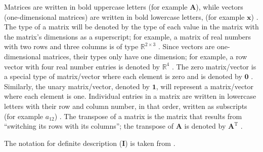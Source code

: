 \documentclass[12pt]{article}
\newcommand*{\defDesc}{\mathbf{I}}
\begin{document}
Matrices are written in bold uppercase letters (for example $\textbf{A}$),
while vectors (one-dimensional matrices) are written in bold lowercase letters,
(for example
$\textbf{x}$) \cite{osullivan_appendix_2010}. The type of a matrix will be
denoted by the type of each value in the matrix with the matrix's dimensions
as a superscript; for example, a matrix of real numbers with two rows and
three columns is of type $\mathbb{R}^{2 \times 3}$
\cite[p.~3]{golub_matrix_2013}. Since vectors are one-dimensional
matrices, their types only have one dimension; for example, a row vector with
four real number entries is denoted by $\mathbb{R}^{4}$
\cite[p.~4]{golub_matrix_2013}. The zero matrix/vector is a special
type of matrix/vector where each element is zero and is denoted by
$\textbf{0}$ \cite{weisstein_zero_2023}. Similarly, the unary matrix/vector,
denoted by $\textbf{1}$, will represent a matrix/vector where each element is
one. Individual entries in a matrix are written in
lowercase letters with their row and column number, in that order, written as
subscripts (for example $a_{12}$) \cite{osullivan_appendix_2010}.
The transpose of a matrix is the matrix that results from ``switching its rows
with its columns''; the transpose of $\mathbf{A}$ is denoted by
$\mathbf{A}^\mathrm{T}$ \cite{nykamp_transpose_nodate}.

The notation for definite description ($\defDesc$) is taken from
\cite{farmer_simple_2023}.


\newpage


\end{document}
